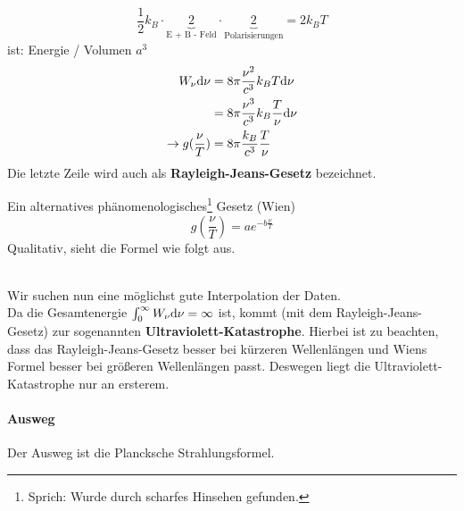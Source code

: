 \begin{folgerung*}
 \[ \frac12 k_B \cdot \underbrace{2}_{\text{E + B - Feld}} \cdot \underbrace{2}_{\text{Polarisierungen}} = 2 k_B T
 \]
ist:
Energie / Volumen $a^3$
\begin{align*}
	W_\nu \mathrm d \nu &= 8 \pi \frac{\nu^2}{c^3} k_B T \mathrm d \nu\\
	&= 8 \pi \frac{\nu^3}{c^3} k_B \frac{T}{\nu} \mathrm d \nu\\
	\rightarrow g(\frac{\nu}{T}) &= 8 \pi \frac{k_B}{c^3} \frac{T}{\nu}
\end{align*}
Die letzte Zeile wird auch als \textbf{Rayleigh-Jeans-Gesetz} bezeichnet.
\begin{center}
\end{center}
\end{folgerung*}
Ein alternatives phänomenologisches\footnote{Sprich: Wurde durch scharfes Hinsehen gefunden.} Gesetz (Wien)
$$g(\frac{\nu}{T}) = a e^{- b \frac{\nu}{T}}$$
Qualitativ, sieht die Formel wie folgt aus.
\begin{center}
\end{center}~\\
Wir suchen nun eine möglichst gute Interpolation der Daten.\\
Da die Gesamtenergie $\int_0^\infty W_\nu \mathrm d \nu = \infty$ ist, kommt (mit dem Rayleigh-Jeans-Gesetz) zur sogenannten \textbf{Ultraviolett-Katastrophe}. Hierbei ist zu beachten, dass das Rayleigh-Jeans-Gesetz besser bei kürzeren Wellenlängen und Wiens Formel besser bei größeren Wellenlängen passt. Deswegen liegt die Ultraviolett-Katastrophe nur an ersterem.

\paragraph{Ausweg} Der Ausweg ist die Plancksche Strahlungsformel.

